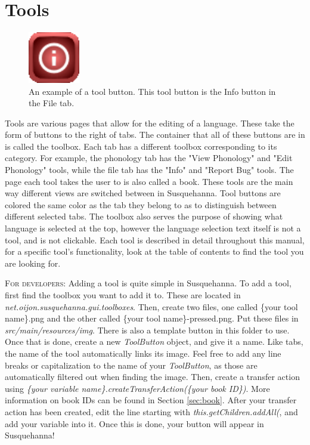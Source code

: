 \documentclass{report}
\begin{document}
	\section{Tools}\label{sec:tools}
	\begin{figure}
		\centering
		\includegraphics[width=0.2\textwidth]{img/info}
		\caption{An example of a tool button. This tool button is the Info button in the File tab.}
		\label{fig:tool-button}
	\end{figure}
	Tools are various pages that allow for the editing of a language. These take the form of buttons to the right of tabs. The container that all of these buttons are in is called the toolbox. Each tab has a different toolbox corresponding to its category. For example, the phonology tab has the "View Phonology" and "Edit Phonology" tools, while the file tab has the "Info" and "Report Bug" tools. The page each tool takes the user to is also called a book. These tools are the main way different views are switched between in Susquehanna. Tool buttons are colored the same color as the tab they belong to as to distinguish between different selected tabs. The toolbox also serves the purpose of showing what language is selected at the top, however the language selection text itself is not a tool, and is not clickable. Each tool is described in detail throughout this manual, for a specific tool's functionality, look at the table of contents to find the tool you are looking for.
	\begin{tcolorbox}[width=1\textwidth]
		\textsc{For developers:} Adding a tool is quite simple in Susquehanna. To add a tool, first find the toolbox you want to add it to. These are located in \emph{net.oijon.susquehanna.gui.toolboxes}. Then, create two files, one called \{your tool name\}.png and the other called \{your tool name\}-pressed.png. Put these files in \emph{src/main/resources/img}. There is also a template button in this folder to use. Once that is done, create a new \emph{ToolButton} object, and give it a name. Like tabs, the name of the tool automatically links its image. Feel free to add any line breaks or capitalization to the name of your \emph{ToolButton}, as those are automatically filtered out when finding the image. Then, create a transfer action using \emph{\{your variable name\}.createTransferAction(\{your book ID\})}. More information on book IDs can be found in Section \ref{sec:book}. After your transfer action has been created, edit the line starting with \emph{this.getChildren.addAll(}, and add your variable into it. Once this is done, your button will appear in Susquehanna!
	\end{tcolorbox}
\end{document}
